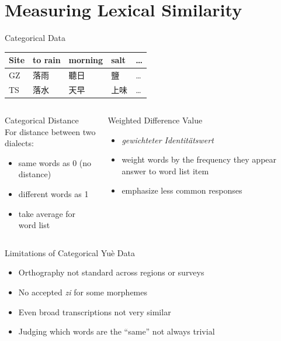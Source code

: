 \documentclass[presentation]{beamer}
\begin{document}
\section{Measuring Lexical Similarity}
\label{sec:orgee41c09}
\begin{frame}[label={sec:orge84d444}]{Categorical Data}
\begin{center}
\begin{tabular}{lllll}
Site & to rain & morning & salt & \ldots{}\\
\hline
GZ & 落雨 & 聽日 & 鹽 & \ldots{}\\
TS & 落水 & 天早 & 上味 & \ldots{}\\
\end{tabular}
\end{center}
\begin{columns}
\begin{column}{0.5\columnwidth}
\begin{block}{Categorical Distance}
\textcite{seguy1971relationentre} \\
For distance between two dialects:
\begin{itemize}
\item same words as 0 (no distance)
\item different words as 1
\item take average for word list
\end{itemize}
\end{block}
\end{column}
\begin{column}{0.5\columnwidth}
\begin{block}{Weighted Difference Value}
\textcite{goebl1984dialektometrischestudien}
\begin{itemize}
\item \emph{gewichteter Identitätswert}
\item weight words by the frequency they appear answer to word list item
\item emphasize less common responses
\end{itemize}
\end{block}
\end{column}
\end{columns}
\end{frame}
\begin{frame}[label={sec:org769d2a7}]{Limitations of Categorical Yuè Data}
\begin{itemize}
\item Orthography not standard across regions or surveys
\item No accepted \emph{zi} for some morphemes
\item Even broad transcriptions not very similar
\item Judging which words are the ``same'' not always trivial
\end{itemize}
\end{frame}
\end{document}
